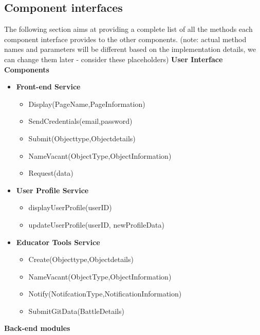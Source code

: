 \subsection{Component interfaces}
The following section aims at providing a complete list of all the methods each component interface provides to the other components.
(note: actual method names and parameters will be different based on the implementation details, we can change them later - consider these placeholders)
\bigskip \newline 
\textbf{User Interface Components}
\begin{itemize}
    \item \textbf{Front-end Service}
        \begin{itemize}
            \item Display(PageName,PageInformation)
            \item SendCredentials(email,password)
            \item Submit(Objecttype,Objectdetails)
            \item NameVacant(ObjectType,ObjectInformation)
            \item Request(data)
        \end{itemize}
    \item \textbf{User Profile Service}
        \begin{itemize}
            \item displayUserProfile(userID)
            \item updateUserProfile(userID, newProfileData)
        \end{itemize}
    \item \textbf{Educator Tools Service}
        \begin{itemize}
            \item Create(Objecttype,Objectdetails)
            \item NameVacant(ObjectType,ObjectInformation)
            \item Notify(NotifcationType,NotificationInformation)
            \item SubmitGitData(BattleDetails)
        \end{itemize}
\end{itemize}

\textbf{Back-end modules}

